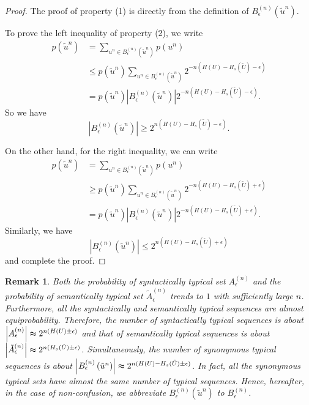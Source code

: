 \documentclass[12pt, draftclsnofoot,onecolumn]{IEEEtran}
\newtheorem{remark}{\bf{Remark}}
\begin{document}
\begin{proof}
The proof of property (1) is directly from the definition of $B_{\epsilon}^{(n)}\left(\tilde{u}^n\right)$.

To prove the left inequality of property (2), we write
\begin{equation}
\begin{aligned}
p\left(\tilde{u}^n\right)&=\sum_{u^n\in B_{\epsilon}^{(n)}\left(\tilde{u}^n\right)} p\left(u^n\right) \\
&\leq p\left(\tilde{u}^n\right) \sum_{u^n \in B_{\epsilon}^{(n)}\left(\tilde{u}^n\right)}2^{-n\left(H(U)-H_s(\tilde{U})-\epsilon\right)}\\
& =p\left(\tilde{u}^n\right) \left|B_{\epsilon}^{(n)}\left(\tilde{u}^n\right)\right| 2^{-n\left(H(U)-H_s(\tilde{U})-\epsilon\right)}.
\end{aligned}
\end{equation}
So we have
\begin{equation}
\left|B_{\epsilon}^{(n)}\left(\tilde{u}^n\right)\right|\geq 2^{n\left(H(U)-H_s(\tilde{U})-\epsilon\right)}.
\end{equation}

On the other hand, for the right inequality, we can write
\begin{equation}
\begin{aligned}
p\left(\tilde{u}^n\right)&=\sum_{u^n\in B_{\epsilon}^{(n)}\left(\tilde{u}^n\right)} p\left(u^n\right) \\
&\geq p\left(\tilde{u}^n\right) \sum_{u^n \in B_{\epsilon}^{(n)}\left(\tilde{u}^n\right)}2^{-n\left(H(U)-H_s(\tilde{U})+\epsilon\right)}\\
& =p\left(\tilde{u}^n\right) \left|B_{\epsilon}^{(n)}\left(\tilde{u}^n\right)\right| 2^{-n\left(H(U)-H_s(\tilde{U})+\epsilon\right)}.
\end{aligned}
\end{equation}
Similarly, we have
\begin{equation}
\left|B_{\epsilon}^{(n)}\left(\tilde{u}^n\right)\right| \leq 2^{n\left(H(U)-H_s(\tilde{U})+\epsilon\right)}
\end{equation}
and complete the proof.
\end{proof}

\begin{remark}
Both the probability of syntactically typical set $A_{\epsilon}^{(n)}$ and the probability of semantically typical set $\tilde{A}_{\epsilon}^{(n)}$ trends to $1$ with sufficiently large $n$. Furthermore, all the syntactically and semantically typical sequences are almost equiprobability. Therefore, the number of syntactically typical sequences is about $\left|A_{\epsilon}^{(n)}\right|\thickapprox2^{n(H(U)\pm\epsilon)}$ and that of semantically typical sequences is about $\left|\tilde{A}_{\epsilon}^{(n)}\right|\thickapprox2^{n(H_s(\tilde{U})\pm\epsilon)}$. Simultaneously, the number of synonymous typical sequences is about $\left|B_{\epsilon}^{(n)}\left(\tilde{u}^n\right)\right|\thickapprox2^{n(H(U)-H_s(\tilde{U})\pm\epsilon)}$. In fact, all the synonymous typical sets have almost the same number of typical sequences. Hence, hereafter, in the case of non-confusion, we abbreviate $B_{\epsilon}^{(n)}\left(\tilde{u}^n\right)$ to $B_{\epsilon}^{(n)}$.
\end{remark}
\end{document}
